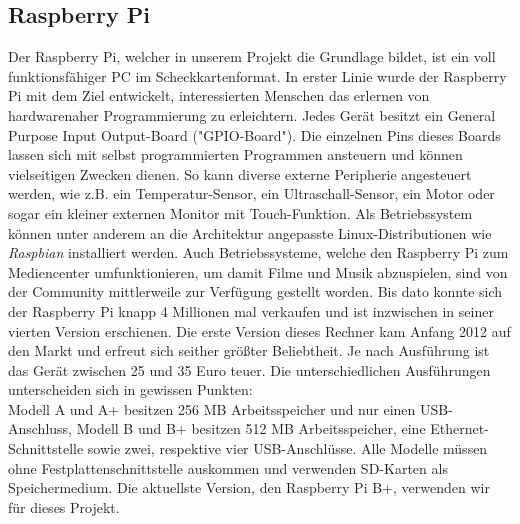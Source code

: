\documentclass[journal, compsoc ]{IEEEtran}
\begin{document}
\subsection{Raspberry Pi}
Der Raspberry Pi, welcher in unserem Projekt die Grundlage bildet, ist ein voll funktionsfähiger PC im Scheckkartenformat. 
In erster Linie wurde der Raspberry Pi mit dem Ziel entwickelt, interessierten Menschen das erlernen von hardwarenaher Programmierung zu erleichtern.
Jedes Gerät besitzt ein General Purpose Input Output-Board ("GPIO-Board").
Die einzelnen Pins dieses Boards lassen sich mit selbst programmierten Programmen ansteuern und können vielseitigen Zwecken dienen.
So kann diverse externe Peripherie angesteuert werden, wie z.B. ein Temperatur-Sensor, ein Ultraschall-Sensor, ein Motor oder sogar ein kleiner externen Monitor mit Touch-Funktion.
Als Betriebssystem können unter anderem an die Architektur angepasste Linux-Distributionen wie \textit{Raspbian} installiert werden. 
Auch Betriebssysteme, welche den Raspberry Pi zum Mediencenter umfunktionieren, um damit Filme und Musik abzuspielen, sind von der Community mittlerweile zur Verfügung gestellt worden.
Bis dato konnte sich der Raspberry Pi knapp 4 Millionen mal verkaufen und ist inzwischen in seiner vierten Version erschienen. \cite{verkaufszahlen}
Die erste Version dieses Rechner kam Anfang 2012 auf den Markt und erfreut sich seither größter Beliebtheit.
Je nach Ausführung ist das Gerät zwischen 25 und 35 Euro teuer. 
Die unterschiedlichen Ausführungen unterscheiden sich in gewissen Punkten: \\
Modell A und A+ besitzen 256 MB Arbeitsspeicher und nur einen USB-Anschluss, Modell B und B+ besitzen 512 MB Arbeitsspeicher, eine Ethernet-Schnittstelle sowie zwei, respektive vier USB-Anschlüsse.
Alle Modelle müssen ohne Festplattenschnittstelle auskommen und verwenden SD-Karten als Speichermedium.
Die aktuellste Version, den Raspberry Pi B+, verwenden wir für dieses Projekt.\\
\end{document}
